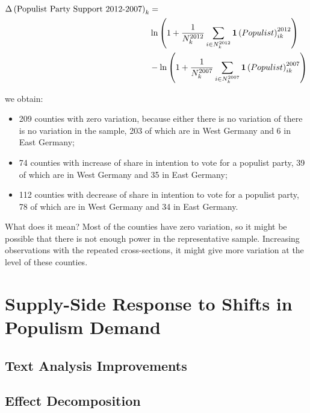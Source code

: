 \documentclass[11pt]{article}
\begin{document}
\begin{align*}
    \Delta\left( \text{Populist Party Support 2012-2007} \right)_{k} &= \\
    &\ln\left( 1 + \frac{1}{N_{k}^{2012}}\sum_{i \in N_{k}^{2012}} \mathbf{1}\left( Populist \right)_{ik}^{2012} \right)\\
    &- \ln\left( 1 + \frac{1}{N_{k}^{2007}}\sum_{i \in N_{k}^{2007}} \mathbf{1}\left( Populist \right)_{ik}^{2007} \right)
\end{align*}

we obtain:

\begin{itemize}
    \item 209 counties with zero variation, because either there is no variation of there is no variation in the sample, 203 of which are in West Germany and 6 in East Germany;
    \item 74 counties with increase of share in intention to vote for a populist party, 39 of which are in West Germany and 35 in East Germany;
    \item 112 counties with decrease of share in intention to vote for a populist party, 78 of which are in West Germany and 34 in East Germany.
\end{itemize}

What does it mean? Most of the counties have zero variation, so it might be possible that there is not enough power in the representative sample. Increasing observations with the repeated cross-sections, it might give more variation at the level of these counties.



\section{Supply-Side Response to Shifts in Populism Demand}

\subsection{Text Analysis Improvements}

\subsection{Effect Decomposition}

\end{document}
